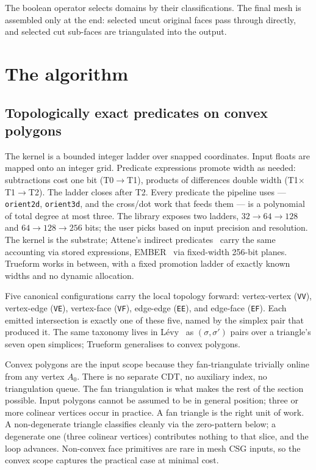 \documentclass{egpubl}
\begin{document}
The boolean operator selects domains by their classifications. The final mesh is assembled only at the end: selected uncut original faces pass through directly, and selected cut sub-faces are triangulated into the output.


\section{The algorithm}
\label{sec:algorithm}

\subsection{Topologically exact predicates on convex polygons}
\label{sec:predicates}

The kernel is a bounded integer ladder over snapped coordinates. Input floats are mapped onto an integer grid. Predicate expressions promote width as needed: subtractions cost one bit (T0$\to$T1), products of differences double width (T1$\times$T1$\to$T2). The ladder closes after T2. Every predicate the pipeline uses --- \texttt{orient2d}, \texttt{orient3d}, and the cross/dot work that feeds them --- is a polynomial of total degree at most three. The library exposes two ladders, $32{\to}64{\to}128$ and $64{\to}128{\to}256$ bits; the user picks based on input precision and resolution. The kernel is the substrate; Attene's indirect predicates~\cite{Attene2020} carry the same accounting via stored expressions, EMBER~\cite{Trettner2022} via fixed-width 256-bit planes. Trueform works in between, with a fixed promotion ladder of exactly known widths and no dynamic allocation.

Five canonical configurations carry the local topology forward: vertex-vertex (\texttt{VV}), vertex-edge (\texttt{VE}), vertex-face (\texttt{VF}), edge-edge (\texttt{EE}), and edge-face (\texttt{EF}). Each emitted intersection is exactly one of these five, named by the simplex pair that produced it. The same taxonomy lives in L\'evy~\cite{Levy2025} as $(\sigma, \sigma')$ pairs over a triangle's seven open simplices; Trueform generalises to convex polygons.

Convex polygons are the input scope because they fan-triangulate trivially online from any vertex $A_0$. There is no separate CDT, no auxiliary index, no triangulation queue. The fan triangulation is what makes the rest of the section possible. Input polygons cannot be assumed to be in general position; three or more colinear vertices occur in practice. A fan triangle is the right unit of work. A non-degenerate triangle classifies cleanly via the zero-pattern below; a degenerate one (three colinear vertices) contributes nothing to that slice, and the loop advances. Non-convex face primitives are rare in mesh CSG inputs, so the convex scope captures the practical case at minimal cost.
\end{document}
